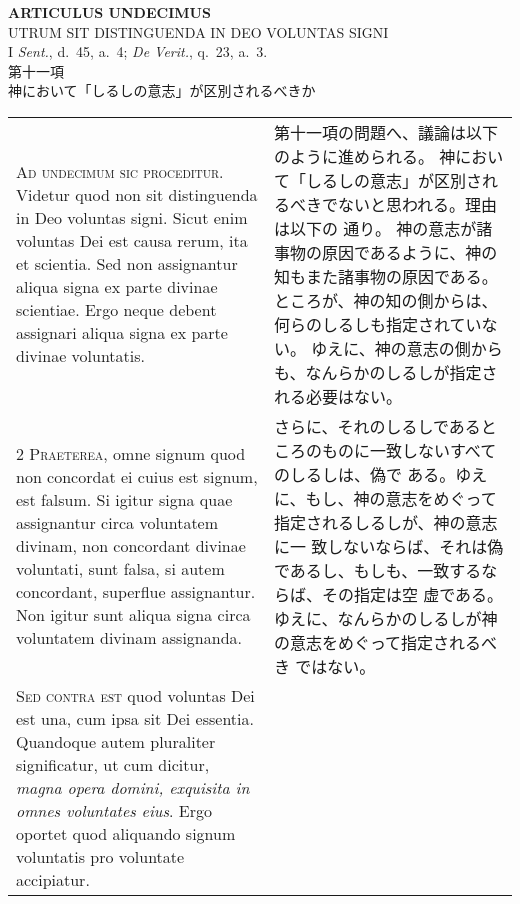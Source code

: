 \documentclass[10pt]{jsarticle} %
\begin{document}
\begin{center}
 {\Large {\bf ARTICULUS UNDECIMUS}}\\
 {\large UTRUM SIT DISTINGUENDA IN DEO VOLUNTAS SIGNI}\\
 {\footnotesize I {\itshape Sent.}, d.~45, a.~4; {\itshape De Verit.},
 q.~23, a.~3.}\\
 {\Large 第十一項\\神において「しるしの意志」が区別されるべきか}
\end{center}

\begin{longtable}{p{21em}p{21em}}


{\huge A}{\scshape d undecimum sic proceditur}. Videtur quod
non sit distinguenda in Deo voluntas signi. Sicut enim voluntas Dei est
causa rerum, ita et scientia. Sed non assignantur aliqua signa ex parte
divinae scientiae. Ergo neque debent assignari aliqua signa ex parte
divinae voluntatis.


&

第十一項の問題へ、議論は以下のように進められる。
神において「しるしの意志」が区別されるべきでないと思われる。理由は以下の
 通り。
神の意志が諸事物の原因であるように、神の知もまた諸事物の原因である。
ところが、神の知の側からは、何らのしるしも指定されていない。
ゆえに、神の意志の側からも、なんらかのしるしが指定される必要はない。


\\


{\scshape 2 Praeterea}, omne signum quod non concordat
ei cuius est signum, est falsum. Si igitur signa quae assignantur circa
voluntatem divinam, non concordant divinae voluntati, sunt falsa, si
autem concordant, superflue assignantur. Non igitur sunt aliqua signa
circa voluntatem divinam assignanda.


&


さらに、それのしるしであるところのものに一致しないすべてのしるしは、偽で
 ある。ゆえに、もし、神の意志をめぐって指定されるしるしが、神の意志に一
 致しないならば、それは偽であるし、もしも、一致するならば、その指定は空
 虚である。ゆえに、なんらかのしるしが神の意志をめぐって指定されるべき
 ではない。

\\


{\scshape Sed contra est} quod voluntas Dei est una,
cum ipsa sit Dei essentia. Quandoque autem pluraliter significatur, ut
cum dicitur, {\itshape magna opera domini, exquisita in omnes voluntates
eius}. Ergo oportet quod aliquando signum voluntatis pro voluntate
accipiatur.



\end{longtable}
\end{document}
